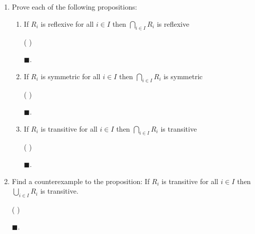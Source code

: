 \documentclass{article}
\theoremstyle{definition}
\renewcommand{\qed}{\blacksquare}
\begin{document}
	\vspace{0.2cm}
	\begin{enumerate}
		\item[a] Prove each of the following propositions:

		\begin{enumerate}
			\item[i]
			If $R_i$ is reflexive for all $i \in I$ then
			$\bigcap_{ i\in I} R_i$ is reflexive

			\vspace{0.2cm}
			 ( )
			\vspace{0.2cm}

			$\qed$.

			\vspace{0.2cm}

			\item[ii]
			If $R_i$ is symmetric for all $i \in I$ then
			$\bigcap_{i \in I} R_i$ is symmetric

			\vspace{0.2cm}
			 ( )
			\vspace{0.2cm}

			$\qed$.

			\vspace{0.2cm}

			\item[iii]
			If $R_i$ is transitive for all $ i\in I$ then
			$\bigcap_{i \in I} R_i$ is transitive

			\vspace{0.2cm}
			 ( )
			\vspace{0.2cm}

			$\qed$.

			\vspace{0.2cm}

		\end{enumerate}

		\vspace{0.2cm}

		\item[b] Find a counterexample to the proposition: If $R_i$ is transitive for all $i \in I$ then $\bigcup_{i \in I} R_i$ is transitive.

		\vspace{0.2cm}
		 ( )
		\vspace{0.2cm}

		$\qed$.

		\vspace{0.5cm}

	\end{enumerate}
\end{document}
